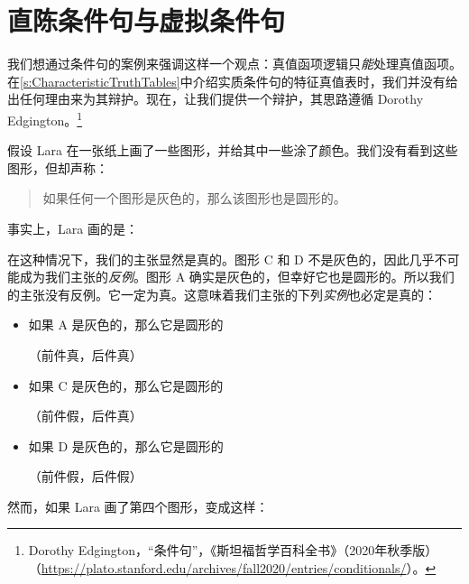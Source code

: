 \section{直陈条件句与虚拟条件句}\label{s:IndicativeSubjunctive}
我们想通过条件句的案例来强调这样一个观点：真值函项逻辑只\emph{能}处理真值函项。
在\cref{s:CharacteristicTruthTables}中介绍实质条件句的特征真值表时，我们并没有给出任何理由来为其辩护。现在，让我们提供一个辩护，其思路遵循 Dorothy Edgington。\footnote{Dorothy Edgington，“条件句”，《斯坦福哲学百科全书》（2020年秋季版）（\url{https://plato.stanford.edu/archives/fall2020/entries/conditionals/}）。}

假设 Lara 在一张纸上画了一些图形，并给其中一些涂了颜色。我们没有看到这些图形，但却声称：

\begin{quote}
    如果任何一个图形是灰色的，那么该图形也是圆形的。
\end{quote}

事实上，Lara 画的是：

\begin{center}
\end{center}

在这种情况下，我们的主张显然是真的。图形 C 和 D 不是灰色的，因此几乎不可能成为我们主张的\emph{反例}。图形 A 确实是灰色的，但幸好它也是圆形的。所以我们的主张没有反例。它一定为真。这意味着我们主张的下列\emph{实例}也必定是真的：

\begin{itemize}
        \item 如果 A 是灰色的，那么它是圆形的

        \qquad（前件真，后件真）
        \item 如果 C 是灰色的，那么它是圆形的

        \qquad（前件假，后件真）
        \item 如果 D 是灰色的，那么它是圆形的

        \qquad（前件假，后件假）
\end{itemize}

然而，如果 Lara 画了第四个图形，变成这样：

